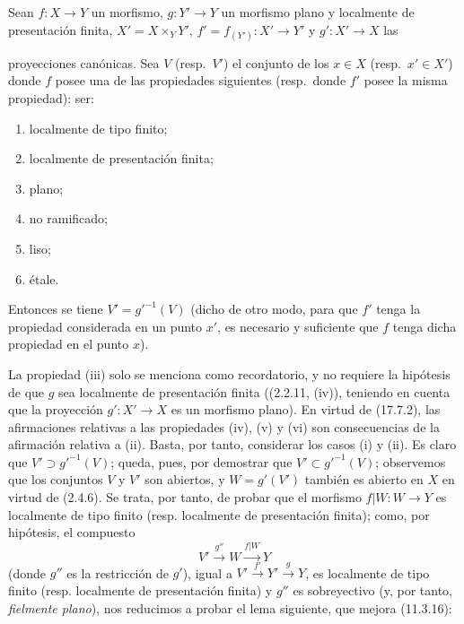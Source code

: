 \begin{proposition}[17.7.4]
\label{IV.17.7.4}
Sean $f:X\to Y$ un morfismo, $g:Y'\to Y$ un morfismo plano y localmente de presentación finita, $X'=X\times_Y Y'$, $f'=f_{(Y')}:X'\to Y'$ y $g':X'\to X$ las


proyecciones canónicas. Sea $V$ \textup{(resp.}\ $V'$\textup{)} el conjunto de los $x\in X$ \textup{(resp.}\ $x'\in X'$\textup{)} donde $f$ posee una de las propiedades siguientes \textup{(resp.}\ donde $f'$ posee la misma propiedad\textup{)}: ser:
\begin{enumerate}
  \item[\textup{(i)}] localmente de tipo finito;
  \item[\textup{(ii)}] localmente de presentación finita;
  \item[\textup{(iii)}] plano;
  \item[\textup{(iv)}] no ramificado;
  \item[\textup{(v)}] liso;
  \item[\textup{(vi)}] étale.
\end{enumerate}
Entonces se tiene $V'=g'^{-1}(V)$ \textup{(dicho de otro modo, para que $f'$ tenga la propiedad considerada en un punto $x'$, es necesario y suficiente que $f$ tenga dicha propiedad en el punto $x$)}.
\end{proposition}

La propiedad (iii) solo se menciona como recordatorio, y no requiere la hipótesis de que $g$ sea localmente de presentación finita ((2.2.11, (iv)), teniendo en cuenta que la proyección $g':X'\to X$ es un morfismo plano). En virtud de (17.7.2), las afirmaciones relativas a las propiedades (iv), (v) y (vi) son consecuencias de la afirmación relativa a (ii). Basta, por tanto, considerar los casos (i) y (ii). Es claro que $V'\supset g'^{-1}(V)$; queda, pues, por demostrar que $V'\subset g'^{-1}(V)$; observemos que los conjuntos $V$ y $V'$ son abiertos, y $W=g'(V')$ también es abierto en $X$ en virtud de (2.4.6). Se trata, por tanto, de probar que el morfismo $f|W:W\to Y$ es localmente de tipo finito (resp. localmente de presentación finita); como, por hipótesis, el compuesto
\[
V'\xrightarrow{g''}W\xrightarrow{f|W}Y
\]
(donde $g''$ es la restricción de $g'$), igual a $V'\xrightarrow{f'}Y'\xrightarrow{g}Y$, es localmente de tipo finito (resp. localmente de presentación finita) y $g''$ es sobreyectivo (y, por tanto, \emph{fielmente plano}), nos reducimos a probar el lema siguiente, que mejora (11.3.16):

